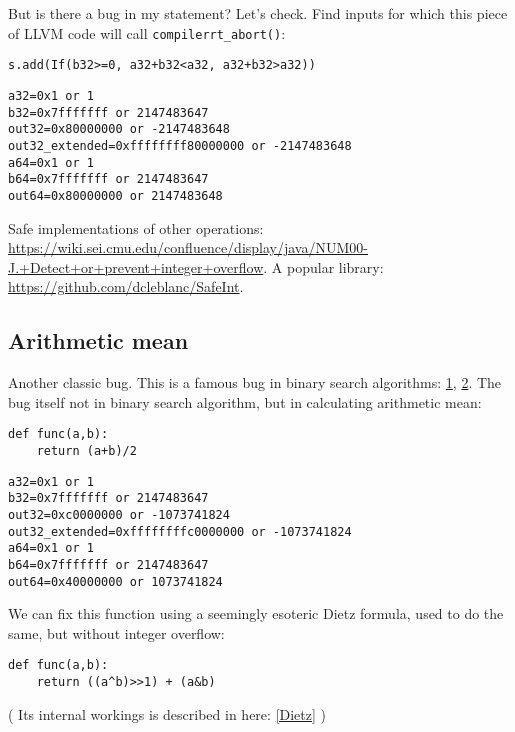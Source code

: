 But is there a bug in my statement?
Let's check.
Find inputs for which this piece of LLVM code will call \verb|compilerrt_abort()|:

\begin{lstlisting}
s.add(If(b32>=0, a32+b32<a32, a32+b32>a32))
\end{lstlisting}

\begin{lstlisting}
a32=0x1 or 1
b32=0x7fffffff or 2147483647
out32=0x80000000 or -2147483648
out32_extended=0xffffffff80000000 or -2147483648
a64=0x1 or 1
b64=0x7fffffff or 2147483647
out64=0x80000000 or 2147483648
\end{lstlisting}

Safe implementations of other operations:
\url{https://wiki.sei.cmu.edu/confluence/display/java/NUM00-J.+Detect+or+prevent+integer+overflow}.
A popular library:
\url{https://github.com/dcleblanc/SafeInt}.

\subsection{Arithmetic mean}

Another classic bug. This is a famous bug in binary search algorithms:
\href{https://ai.googleblog.com/2006/06/extra-extra-read-all-about-it-nearly.html}{1},
\href{https://thebittheories.com/the-curious-case-of-binary-search-the-famous-bug-that-remained-undetected-for-20-years-973e89fc212}{2}.
The bug itself not in binary search algorithm, but in calculating arithmetic mean:

\begin{lstlisting}[style=custompy]
def func(a,b):
    return (a+b)/2
\end{lstlisting}

\begin{lstlisting}
a32=0x1 or 1
b32=0x7fffffff or 2147483647
out32=0xc0000000 or -1073741824
out32_extended=0xffffffffc0000000 or -1073741824
a64=0x1 or 1
b64=0x7fffffff or 2147483647
out64=0x40000000 or 1073741824
\end{lstlisting}

We can fix this function using a seemingly esoteric Dietz formula, used to do the same, but without integer overflow:

\begin{lstlisting}[style=custompy]
def func(a,b):
    return ((a^b)>>1) + (a&b)
\end{lstlisting}

( Its internal workings is described in here: \ref{Dietz} )


